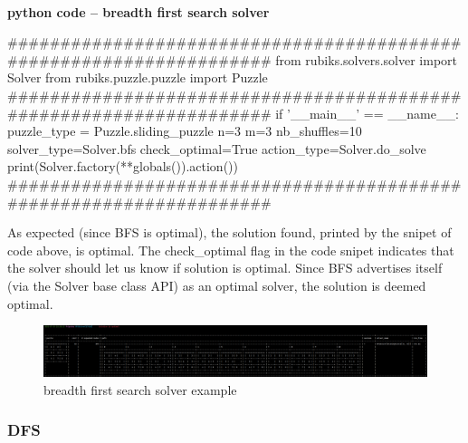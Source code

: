 \afblue
\paragraph{}{\textbf{python code -- breadth first search solver}}
\begin{python}
####################################################################
from rubiks.solvers.solver import Solver
from rubiks.puzzle.puzzle import Puzzle
####################################################################
if '__main__' == __name__:
    puzzle_type = Puzzle.sliding_puzzle
    n=3
    m=3
    nb_shuffles=10
    solver_type=Solver.bfs
    check_optimal=True
    action_type=Solver.do_solve
    print(Solver.factory(**globals()).action())
####################################################################
\end{python}
\black

As expected (since BFS is optimal), the solution found, printed by the snipet of code above, is optimal. The check\_optimal flag in the code snipet indicates that the solver should let us know if solution is optimal. Since BFS advertises itself (via the Solver base class API)  as an optimal solver, the solution is deemed optimal.


\begin{figure}[H]
\centering
\includegraphics[scale=0.25]{./Figures/examplebfssolver}
\caption[Examples]{breadth first search solver example}
\label{fig:examplebfssolver}
\end{figure}

\subsubsection{DFS}
\label{DFSSS}



\afblue
